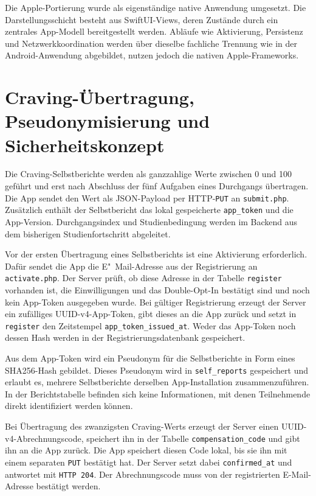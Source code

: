 Die Apple-Portierung wurde als eigenständige native Anwendung umgesetzt. Die Darstellungsschicht besteht aus SwiftUI-Views, deren Zustände durch ein zentrales App-Modell bereitgestellt werden. Abläufe wie Aktivierung, Persistenz und Netzwerkkoordination werden über dieselbe fachliche Trennung wie in der Android-Anwendung abgebildet, nutzen jedoch die nativen Apple-Frameworks.

\section{Craving-Übertragung, Pseudonymisierung und Sicherheitskonzept}

Die Craving-Selbstberichte werden als ganzzahlige Werte zwischen 0 und 100 geführt und erst nach Abschluss der fünf Aufgaben eines Durchgangs übertragen. Die App sendet den Wert als JSON-Payload per HTTP-\texttt{PUT} an \texttt{submit.php}. Zusätzlich enthält der Selbstbericht das lokal gespeicherte \texttt{app\_token} und die App-Version. Durchgangsindex und Studienbedingung werden im Backend aus dem bisherigen Studienfortschritt abgeleitet.

Vor der ersten Übertragung eines Selbstberichts ist eine Aktivierung erforderlich. Dafür sendet die App die E"~Mail-Adresse aus der Registrierung an \texttt{activate.php}. Der Server prüft, ob diese Adresse in der Tabelle \texttt{register} vorhanden ist, die Einwilligungen und das Double-Opt-In bestätigt sind und noch kein App-Token ausgegeben wurde. Bei gültiger Registrierung erzeugt der Server ein zufälliges UUID-v4-App-Token, gibt dieses an die App zurück und setzt in \texttt{register} den Zeitstempel \texttt{app\_token\_issued\_at}. Weder das App-Token noch dessen Hash werden in der Registrierungsdatenbank gespeichert.

Aus dem App-Token wird ein Pseudonym für die Selbstberichte in Form eines SHA256-Hash gebildet. Dieses Pseudonym wird in \texttt{self\_reports} gespeichert und erlaubt es, mehrere Selbstberichte derselben App-Installation zusammenzuführen. In der Berichtstabelle befinden sich keine Informationen, mit denen Teilnehmende direkt identifiziert werden können.

Bei Übertragung des zwanzigsten Craving-Werts erzeugt der Server einen UUID-v4-Abrech\-nungs\-code, speichert ihn in der Tabelle \texttt{compensation\_code} und gibt ihn an die App zurück. Die App speichert diesen Code lokal, bis sie ihn mit einem separaten \texttt{PUT} bestätigt hat. Der Server setzt dabei \texttt{confirmed\_at} und antwortet mit \texttt{HTTP 204}. Der Abrechnungscode muss von der registrierten E-Mail-Adresse bestätigt werden.

